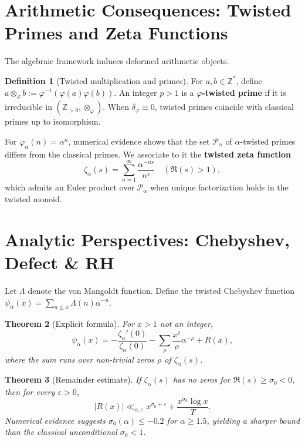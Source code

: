 \documentclass[11pt,a4paper]{article}
\theoremstyle{plain}
\newtheorem{theorem}{Theorem}[section]
\theoremstyle{definition}
\newtheorem{definition}[theorem]{Definition}
\theoremstyle{remark}
\newcommand{\ZZ}{\mathbb{Z}}
\begin{document}
	\section{Arithmetic Consequences: Twisted Primes and Zeta Functions}
	\label{sec:arithmetic}
	The algebraic framework induces deformed arithmetic objects.
	
	\begin{definition}[Twisted multiplication and primes]
		For $a,b\in\ZZ^*$, define $a\otimes_\varphi b:=\varphi^{-1}(\varphi(a)\varphi(b))$. An integer $p>1$ is a \textbf{$\varphi$-twisted prime} if it is irreducible in $(\ZZ_{>0},\otimes_\varphi)$. When $\delta_\varphi\equiv 0$, twisted primes coincide with classical primes up to isomorphism.
	\end{definition}
	
	For $\varphi_\alpha(n)=\alpha^n$, numerical evidence shows that the set $\mathcal{P}_\alpha$ of $\alpha$-twisted primes differs from the classical primes. We associate to it the \textbf{twisted zeta function}
	\[
	\zeta_\alpha(s)=\sum_{n=1}^\infty \frac{\alpha^{-ns}}{n^s} \quad (\Re(s)>1),
	\]
	which admits an Euler product over $\mathcal{P}_\alpha$ when unique factorization holds in the twisted monoid.
	
	\section{Analytic Perspectives: Chebyshev, Defect \& RH}
	\label{sec:analytic}
	Let $\Lambda$ denote the von Mangoldt function. Define the twisted Chebyshev function $\psi_\alpha(x)=\sum_{n\leq x}\Lambda(n)\alpha^{-n}$.
	
	\begin{theorem}[Explicit formula]
		For $x>1$ not an integer,
		\[
		\psi_\alpha(x)=-\frac{\zeta_\alpha'(0)}{\zeta_\alpha(0)}-\sum_{\rho}\frac{x^\rho}{\rho}\alpha^{-\rho}+R(x),
		\]
		where the sum runs over non-trivial zeros $\rho$ of $\zeta_\alpha(s)$.
	\end{theorem}
	
	\begin{theorem}[Remainder estimate]
		If $\zeta_\alpha(s)$ has no zeros for $\Re(s)\geq\sigma_0<0$, then for every $\varepsilon>0$,
		\[
		|R(x)|\ll_{\alpha,\varepsilon} x^{\sigma_0+\varepsilon}+\frac{x^{\sigma_0}\log x}{T}.
		\]
		Numerical evidence suggests $\sigma_0(\alpha)\leq -0.2$ for $\alpha\geq 1.5$, yielding a sharper bound than the classical unconditional $\sigma_0<1$.
	\end{theorem}
	
\end{document}
